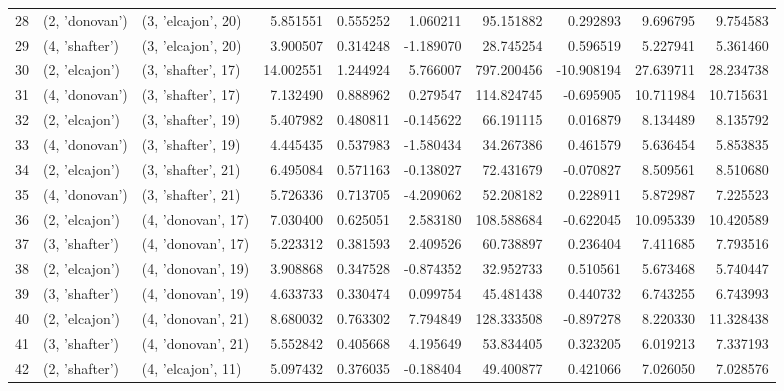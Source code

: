 \begin{tabular}{lllrrrrrrr}
28 &   (2, 'donovan') &  (3, 'elcajon', 20) &   5.851551 &   0.555252 &   1.060211 &    95.151882 &   0.292893 &   9.696795 &   9.754583 \\
29 &   (4, 'shafter') &  (3, 'elcajon', 20) &   3.900507 &   0.314248 &  -1.189070 &    28.745254 &   0.596519 &   5.227941 &   5.361460 \\
30 &   (2, 'elcajon') &  (3, 'shafter', 17) &  14.002551 &   1.244924 &   5.766007 &   797.200456 & -10.908194 &  27.639711 &  28.234738 \\
31 &   (4, 'donovan') &  (3, 'shafter', 17) &   7.132490 &   0.888962 &   0.279547 &   114.824745 &  -0.695905 &  10.711984 &  10.715631 \\
32 &   (2, 'elcajon') &  (3, 'shafter', 19) &   5.407982 &   0.480811 &  -0.145622 &    66.191115 &   0.016879 &   8.134489 &   8.135792 \\
33 &   (4, 'donovan') &  (3, 'shafter', 19) &   4.445435 &   0.537983 &  -1.580434 &    34.267386 &   0.461579 &   5.636454 &   5.853835 \\
34 &   (2, 'elcajon') &  (3, 'shafter', 21) &   6.495084 &   0.571163 &  -0.138027 &    72.431679 &  -0.070827 &   8.509561 &   8.510680 \\
35 &   (4, 'donovan') &  (3, 'shafter', 21) &   5.726336 &   0.713705 &  -4.209062 &    52.208182 &   0.228911 &   5.872987 &   7.225523 \\
36 &   (2, 'elcajon') &  (4, 'donovan', 17) &   7.030400 &   0.625051 &   2.583180 &   108.588684 &  -0.622045 &  10.095339 &  10.420589 \\
37 &   (3, 'shafter') &  (4, 'donovan', 17) &   5.223312 &   0.381593 &   2.409526 &    60.738897 &   0.236404 &   7.411685 &   7.793516 \\
38 &   (2, 'elcajon') &  (4, 'donovan', 19) &   3.908868 &   0.347528 &  -0.874352 &    32.952733 &   0.510561 &   5.673468 &   5.740447 \\
39 &   (3, 'shafter') &  (4, 'donovan', 19) &   4.633733 &   0.330474 &   0.099754 &    45.481438 &   0.440732 &   6.743255 &   6.743993 \\
40 &   (2, 'elcajon') &  (4, 'donovan', 21) &   8.680032 &   0.763302 &   7.794849 &   128.333508 &  -0.897278 &   8.220330 &  11.328438 \\
41 &   (3, 'shafter') &  (4, 'donovan', 21) &   5.552842 &   0.405668 &   4.195649 &    53.834405 &   0.323205 &   6.019213 &   7.337193 \\
42 &   (2, 'shafter') &  (4, 'elcajon', 11) &   5.097432 &   0.376035 &  -0.188404 &    49.400877 &   0.421066 &   7.026050 &   7.028576 \\

\end{tabular}
